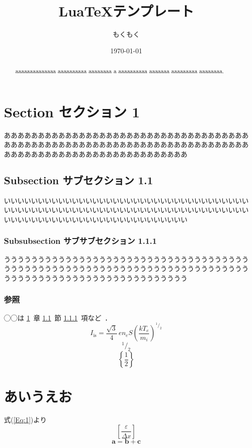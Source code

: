 \documentclass[10pt,a4paper]{ltjsarticle}       %
\title{Lua\TeX テンプレート}
\author{もくもく}
\date{\today}
\newcommand*{\refSec}[1]{\ref{#1}~章}           %
\newcommand*{\refSsec}[1]{\ref{#1}~節}          %
\newcommand*{\refSssec}[1]{\ref{#1}~項}         %
\newcommand*{\refEq}[1]{式(\ref{#1})}           %
\newcommand{\vDel}{\varDelta}                   %
\newcommand{\veps}{\varepsilon}                 %
\newcommand*{\paren}[1]{\left( #1 \right)}      %
\newcommand*{\curly}[1]{\left\{ #1 \right\}}    %
\newcommand*{\bracket}[1]{\left[ #1 \right]}    %
\newcommand*\sfrac[2]{{}^{#1}\!/_{#2}}          %
\renewcommand*\vec[1]{\mathbf{#1}}              %
\begin{document}
\maketitle
\thispagestyle{fancy}

\begin{abstract}
aaaaaaaaaaaaaa aaaaaaaaaa aaaaaaaa a aaaaaaaaaa aaaaaaa aaaaaaaaa aaaaaaaa.
\end{abstract}

\tableofcontents
\clearpage

\section{Section セクション 1} \label{Sec:1}
あああああああああああああああああああああああああああああああああああああああああああああああああああああああああああああああああああああああああああああああああああああああああああああああああああ

\subsection{Subsection サブセクション 1.1} \label{Ssec:1}
いいいいいいいいいいいいいいいいいいいいいいいいいいいいいいいいいいいいいいいいいいいいいいいいいいいいいいいいいいいいいいいいいいいいいいいいいいいいいいいいいいいいいいいいいいいいいいいいいいい

\subsubsection{Subsubsection サブサブセクション 1.1.1} \label{Sssec:1}
ううううううううううううううううううううううううううううううううううううううううううううううううううううううううううううううううううううううううううううううううううううううううううううううううううう

\subsubsection{参照}
◯◯は \refSec{Sec:1} \refSsec{Ssec:1} \refSssec{Sssec:1}など~\cite{hoge}．
\begin{equation} \label{Eq:1}
  I_{\mathrm{is}} = \dfrac{\sqrt{3}}{4} \, en_{e} S \paren{\dfrac{kT_{e}}{m_{i}}}^{\sfrac{1}{2}}
\end{equation}
\begin{equation}
  \sfrac{1}{2}
\end{equation}
\begin{equation}
  \curly{\dfrac{1}{2}}
\end{equation}

\section{あいうえお}
\refEq{Eq:1}より
\begin{equation}
  \bracket{\dfrac{\veps}{\vDel x}}
\end{equation}
\begin{equation}
  \vec{a} = \vec{b} + \vec{c}
\end{equation}



\end{document}
